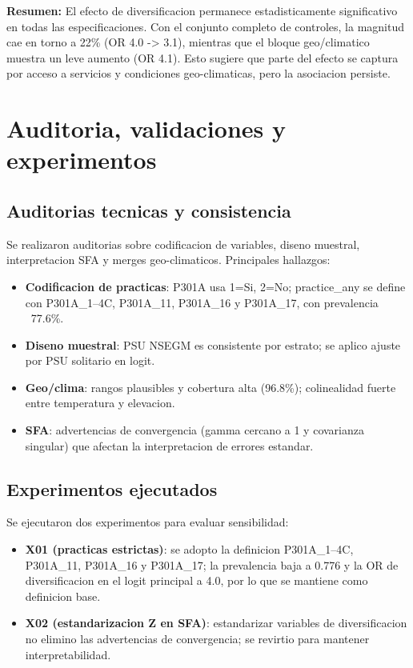 \documentclass[10pt,a4paper]{article}
\begin{document}
\textbf{Resumen:} El efecto de diversificacion permanece estadisticamente significativo en todas las especificaciones. Con el conjunto completo de controles, la magnitud cae en torno a 22\% (OR 4.0 -> 3.1), mientras que el bloque geo/climatico muestra un leve aumento (OR 4.1). Esto sugiere que parte del efecto se captura por acceso a servicios y condiciones geo-climaticas, pero la asociacion persiste.

\section{Auditoria, validaciones y experimentos}

\subsection{Auditorias tecnicas y consistencia}
Se realizaron auditorias sobre codificacion de variables, diseno muestral, interpretacion SFA y merges geo-climaticos. Principales hallazgos:
\begin{itemize}
    \item \textbf{Codificacion de practicas}: P301A usa 1=Si, 2=No; practice\_any se define con P301A\_1--4C, P301A\_11, P301A\_16 y P301A\_17, con prevalencia ~77.6\%.
    \item \textbf{Diseno muestral}: PSU NSEGM es consistente por estrato; se aplico ajuste por PSU solitario en logit.
    \item \textbf{Geo/clima}: rangos plausibles y cobertura alta (96.8\%); colinealidad fuerte entre temperatura y elevacion.
    \item \textbf{SFA}: advertencias de convergencia (gamma cercano a 1 y covarianza singular) que afectan la interpretacion de errores estandar.
\end{itemize}

\subsection{Experimentos ejecutados}
Se ejecutaron dos experimentos para evaluar sensibilidad:
\begin{itemize}
    \item \textbf{X01 (practicas estrictas)}: se adopto la definicion P301A\_1--4C, P301A\_11, P301A\_16 y P301A\_17; la prevalencia baja a 0.776 y la OR de diversificacion en el logit principal a 4.0, por lo que se mantiene como definicion base.
    \item \textbf{X02 (estandarizacion Z en SFA)}: estandarizar variables de diversificacion no elimino las advertencias de convergencia; se revirtio para mantener interpretabilidad.
\end{itemize}
\end{document}

